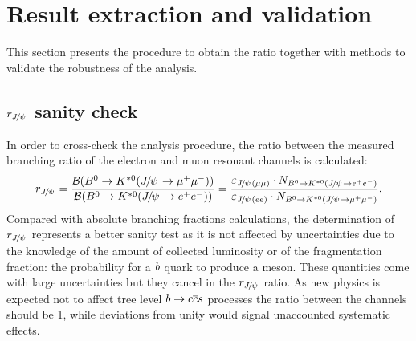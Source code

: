 \clearpage
\section{Result extraction and validation}
\label{sec:RKst_result}

This section presents the procedure to obtain the \RKst ratio together with
methods to validate the robustness of the analysis.


\subsection{$r_{\jpsi}$ sanity check}
\label{sec:Rjpsi}

In order to cross-check the analysis procedure, the ratio between the
measured branching ratio of the electron and muon resonant channels is calculated:
%
\begin{equation}
r_{\jpsi} = \frac{\BR(\Bz\to\Kstarz(\jpsi\to \mumu))} {\BR(\Bz\to\Kstarz(\jpsi\to \epem))} 
= \frac{\varepsilon_{\jpsi(\mu\mu)} \cdot N_{\Bz\to\Kstarz(\jpsi\to \epem)}}{\varepsilon_{\jpsi(ee)} 
\cdot N_{\Bz\to\Kstarz(\jpsi\to \mumu)}}.
\end{equation}
%
Compared with absolute branching fractions calculations, the determination of $r_{\jpsi}$ represents a better
sanity test as it is not affected by uncertainties due to the knowledge of the amount of collected 
luminosity or of the fragmentation fraction: the probability for a ${b}$
quark to produce a \Bz meson. These quantities come with large uncertainties but they cancel
in the $r_{\jpsi}$ ratio. As new physics is expected not to affect tree level $b\rightarrow{\ensuremath{c}}{\ensuremath{\overline {{c}}}}{\ensuremath{s}}$ 
processes the ratio between the \jpsi channels should be 1, while deviations from unity would signal
unaccounted systematic effects.

%
%


